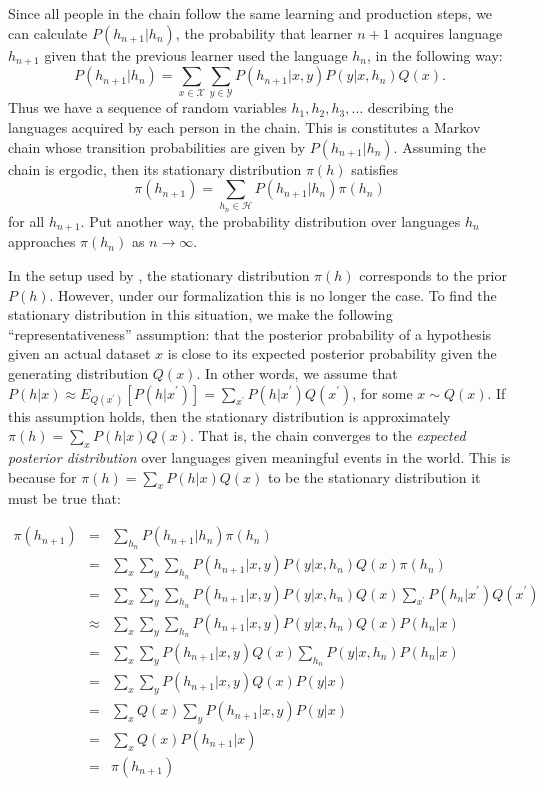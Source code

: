 \documentclass{apa}
\begin{document}
Since all people in the chain follow the same learning and production steps, we can calculate $P(h_{n+1} | h_n)$, the probability that learner $n+1$ acquires language $h_{n+1}$ given that the previous learner used the language $h_n$, in the following way:
\begin{equation}
P(h_{n+1}|h_n) = \displaystyle\sum_{x \in \mathcal{X}} \displaystyle\sum_{y \in \mathcal{Y}} P(h_{n+1}|x,y) P(y|x,h_n) Q(x).
\label{eq:trans}
\end{equation}
Thus we have a sequence of random variables $h_1, h_2, h_3, \ldots$ describing the languages acquired by each person in the chain. This is constitutes a Markov chain whose transition probabilities are given by $P(h_{n+1}|h_n)$. Assuming the chain is ergodic, then its stationary distribution $\pi(h)$ satisfies
\begin{equation}
\pi(h_{n+1}) = \displaystyle \sum_{h_n \in \mathcal{H}} P(h_{n+1}|h_n) \pi(h_n)
\label{eq:trans2}
\end{equation}
\noindent
for all $h_{n+1}$. Put another way, the probability distribution over languages $h_n$ approaches $\pi(h_n)$ as $n \rightarrow \infty$.

In the setup used by , the stationary distribution $\pi(h)$ corresponds to the prior $P(h)$. However, under our formalization this is no longer the case. To find the stationary distribution in this situation, we make the following ``representativeness'' assumption: that the posterior probability of a hypothesis given an actual dataset $x$ is close to its expected posterior probability given the generating distribution $Q(x)$. In other words, we assume that $P(h|x) \approx E_{Q(x^\prime)}[P(h | x^\prime)] = \sum_{x^\prime} P(h | x^\prime) Q(x^\prime)$, for some $x \sim Q(x)$.  If this assumption holds, then the stationary distribution is approximately $\pi(h) = \sum_x P(h | x) Q(x)$. That is, the chain converges to the {\it expected posterior distribution} over languages given meaningful events in the world. This is because for $\pi(h) = \sum_x P(h | x) Q(x)$ to be the stationary distribution it must be true that:

\footnotesize
\begin{eqnarray*}
\pi(h_{n+1})
&=& \sum_{h_n} P(h_{n+1} | h_n) \pi(h_n) \\
&=& \sum_x \sum_y \sum_{h_n} P(h_{n+1} | x, y) P(y | x, h_n) Q(x) \pi(h_n) \\
&=& \sum_x \sum_y \sum_{h_n} P(h_{n+1} | x, y) P(y | x, h_n) Q(x) \sum_{x^\prime} P(h_n | x^\prime) Q(x^\prime) \\
&\approx& \sum_x \sum_y \sum_{h_n} P(h_{n+1} | x, y) P(y | x, h_n) Q(x) P(h_n | x) \\
&=& \sum_x \sum_y  P(h_{n+1} | x, y)  Q(x) \sum_{h_n}  P(y | x, h_n) P(h_n | x) \\
&=& \sum_x \sum_y  P(h_{n+1} | x, y)  Q(x) P(y |x) \\
&=& \sum_x Q(x) \sum_y  P(h_{n+1} | x, y)  P(y |x) \\
&=& \sum_x Q(x)  P(h_{n+1} | x) \\
&=& \pi(h_{n+1})
\end{eqnarray*}
\normalsize
\end{document}
